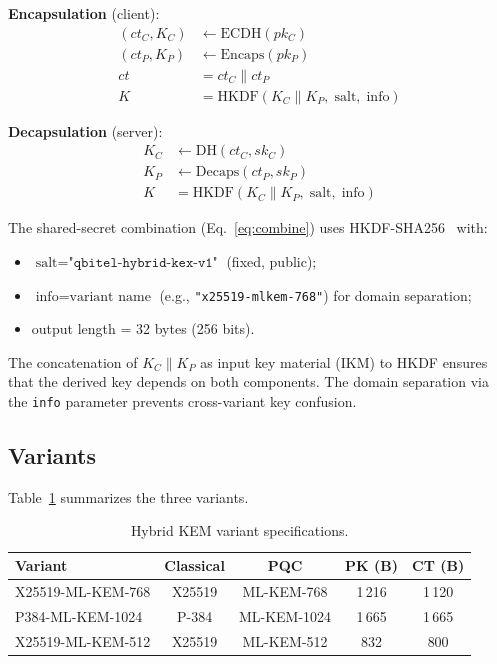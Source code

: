\documentclass[conference,10pt]{IEEEtran}
\begin{document}
\noindent\textbf{Encapsulation} (client):
\begin{align}
  (ct_C, K_C) &\leftarrow \text{ECDH}(pk_C) \\
  (ct_P, K_P) &\leftarrow \text{Encaps}(pk_P) \\
  ct &= ct_C \| ct_P \\
  K &= \text{HKDF}(K_C \| K_P,\; \text{salt},\; \text{info})
  \label{eq:combine}
\end{align}

\noindent\textbf{Decapsulation} (server):
\begin{align}
  K_C &\leftarrow \text{DH}(ct_C, sk_C) \\
  K_P &\leftarrow \text{Decaps}(ct_P, sk_P) \\
  K &= \text{HKDF}(K_C \| K_P,\; \text{salt},\; \text{info})
\end{align}

The shared-secret combination (Eq.~\ref{eq:combine}) uses
HKDF-SHA256~\cite{rfc5869} with:
\begin{itemize}[leftmargin=*]
\item $\text{salt} = \texttt{"qbitel-hybrid-kex-v1"}$ (fixed, public);
\item $\text{info} = \text{variant name}$ (e.g.,
  \texttt{"x25519-mlkem-768"}) for domain separation;
\item output length = 32 bytes (256 bits).
\end{itemize}

The concatenation of $K_C \| K_P$ as input key material (IKM) to HKDF
ensures that the derived key depends on both components. The domain
separation via the \texttt{info} parameter prevents cross-variant key
confusion.

\subsection{Variants}

Table~\ref{tab:hybrid-variants} summarizes the three variants.

\begin{table}[t]
\centering
\caption{Hybrid KEM variant specifications.}
\label{tab:hybrid-variants}
\footnotesize
\begin{tabular}{@{}lcccc@{}}
\toprule
\textbf{Variant} & \textbf{Classical} & \textbf{PQC} & \textbf{PK (B)} & \textbf{CT (B)} \\
\midrule
X25519-ML-KEM-768  & X25519 & ML-KEM-768  & 1\,216 & 1\,120 \\
P384-ML-KEM-1024   & P-384  & ML-KEM-1024 & 1\,665 & 1\,665 \\
X25519-ML-KEM-512  & X25519 & ML-KEM-512  & 832    & 800    \\
\bottomrule
\end{tabular}
\end{table}
\end{document}
